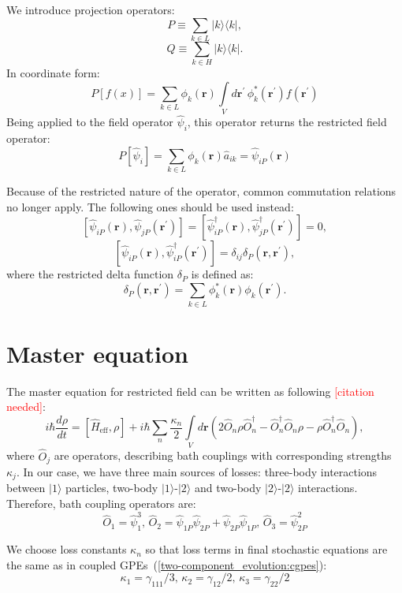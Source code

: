 \documentclass[12pt,notitlepage]{report}
\begin{document}
We introduce projection operators:
\[ P \equiv \sum\limits_{k \in L} \lvert k \rangle \langle k \rvert, \]
\[ Q \equiv \sum\limits_{k \in H} \lvert k \rangle \langle k \rvert. \]
In coordinate form:
\[
P [f(x)] = \sum\limits_{k \in L} \phi_{k} (\mathbf{r}) \int\limits_V d\mathbf{r}^\prime\, \phi_{k}^*(\mathbf{r}^\prime) f(\mathbf{r}^\prime)
\]
Being applied to the field operator $\hat{\psi}_i$, this operator returns the restricted field operator:
\[
P [\hat{\psi}_i] = \sum\limits_{k \in L} \phi_{k} (\mathbf{r}) \hat{a}_{ik} = \hat{\psi}_{iP} (\mathbf{r})
\]

Because of the restricted nature of the operator, common commutation relations no longer apply.
The following ones should be used instead:
\[
\left[ \hat{\psi}_{iP}(\mathbf{r}), \hat{\psi}_{jP}(\mathbf{r}^\prime) \right] =
\left[ \hat{\psi}_{iP}^\dagger(\mathbf{r}), \hat{\psi}_{jP}^\dagger(\mathbf{r}^\prime) \right] = 0,
\]
\[
\left[ \hat{\psi}_{iP}(\mathbf{r}), \hat{\psi}_{iP}^\dagger(\mathbf{r}^\prime) \right] = \delta_{ij} \delta_{P}(\mathbf{r}, \mathbf{r}^\prime),
\]
where the restricted delta function $\delta_P$ is defined as:
\[
\delta_{P}(\mathbf{r}, \mathbf{r}^\prime) = \sum\limits_{k \in L} \phi_{k}^* (\mathbf{r}) \phi_{k} (\mathbf{r}^\prime).
\]

\section{Master equation}

The master equation for restricted field can be written as following \textcolor{red}{[citation needed]}:
\[
i \hbar \frac{d\rho}{d t} = [\hat{H}_{\textrm{eff}}, \rho] + i \hbar \sum\limits_n \frac{\kappa_n}{2} \int\limits_V d\mathbf{r}
\left( 2  \hat{O}_n \rho \hat{O}_n^\dagger - \hat{O}_n^\dagger \hat{O}_n \rho - \rho \hat{O}_n^\dagger \hat{O}_n \right),
\]
where $\hat{O}_j$ are operators, describing bath couplings with corresponding strengths $\kappa_j$.
In our case, we have three main sources of losses: three-body interactions between $\vert1\rangle$ particles,
two-body $\vert1\rangle$-$\vert2\rangle$ and two-body $\vert2\rangle$-$\vert2\rangle$ interactions.
Therefore, bath coupling operators are:
\[
\hat{O}_1 = \hat{\psi}_1^3,\, \hat{O}_2 = \hat{\psi}_{1P} \hat{\psi}_{2P} + \hat{\psi}_{2P} \hat{\psi}_{1P},\, \hat{O}_3 = \hat{\psi}_{2P}^2
\]

We choose loss constants $\kappa_n$ so that loss terms in final stochastic equations
are the same as in coupled GPEs~(\ref{two-component_evolution:cgpes}):
\[
\kappa_1 = \gamma_{111} / 3,\, \kappa_2 = \gamma_{12} / 2,\, \kappa_3 = \gamma_{22} / 2
\]
\end{document}
